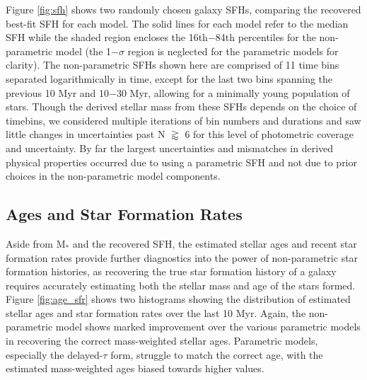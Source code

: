 \documentclass[twocolumn]{aastex62}
\begin{document}
Figure \ref{fig:sfh} shows two randomly chosen galaxy SFHs, comparing the recovered best-fit SFH for each model. The solid lines for each model refer to the median SFH while the shaded region encloses the 16th$-$84th percentiles for the non-parametric model (the 1$-\sigma$ region is neglected for the parametric models for clarity). The non-parametric SFHs shown here are comprised of 11 time bins separated logarithmically in time, except for the last two bins spanning the previous 10 Myr and 10$-$30 Myr, allowing for a minimally young population of stars. Though the derived stellar mass from these SFHs depends on the choice of timebins, we considered multiple iterations of bin numbers and durations and saw little changes in uncertainties past N $\gtrapprox$ 6 for this level of photometric coverage and uncertainty. By far the largest uncertainties and mismatches in derived physical properties occurred due to using a parametric SFH and not due to prior choices in the non-parametric model components.  



\subsection{Ages and Star Formation Rates}\label{section:ages}

Aside from M$_*$ and the recovered SFH, the estimated stellar ages and recent star formation rates provide further diagnostics into the power of non-parametric star formation histories, as recovering the true star formation history of a galaxy requires accurately estimating both the stellar mass and age of the stars formed. Figure \ref{fig:age_sfr} shows two histograms showing the distribution of estimated stellar ages and star formation rates over the last 10 Myr. Again, the non-parametric model shows marked improvement over the various parametric models in recovering the correct mass-weighted stellar ages. Parametric models, especially the delayed-$\tau$ form, struggle to match the correct age, with the estimated mass-weighted ages biased towards higher values.
\end{document}
